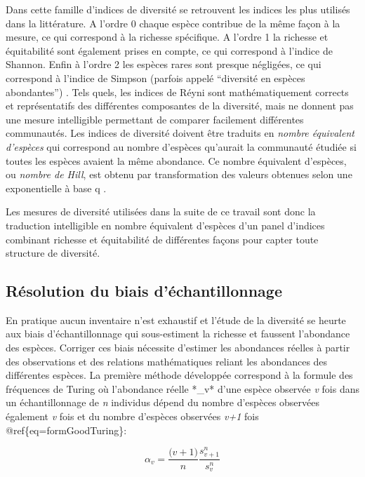 \documentclass[
  11pt,
  french,
  A4paper,
  extrafontsizes,onecolumn,openright
  ]{memoir}
\begin{document}
Dans cette famille d'indices de diversité se retrouvent les indices les
plus utilisés dans la littérature. A l'ordre 0 chaque espèce contribue
de la même façon à la mesure, ce qui correspond à la richesse
spécifique. A l'ordre 1 la richesse et équitabilité sont également
prises en compte, ce qui correspond à l'indice de Shannon. Enfin à
l'ordre 2 les espèces rares sont presque négligées, ce qui correspond à
l'indice de Simpson (parfois appelé ``diversité en espèces abondantes'')
\autocites{Shannon1948}{Simpson1949}{Patil1982}{Tothmeresz1995}. Tels
quels, les indices de Réyni sont mathématiquement corrects et
représentatifs des différentes composantes de la diversité, mais ne
donnent pas une mesure intelligible permettant de comparer facilement
différentes communautés. Les indices de diversité doivent être traduits
en \emph{nombre équivalent d'espèces} qui correspond au nombre d'espèces
qu'aurait la communauté étudiée si toutes les espèces avaient la même
abondance. Ce nombre équivalent d'espèces, ou \emph{nombre de Hill}, est
obtenu par transformation des valeurs obtenues selon une exponentielle à
base q \autocite{Hill1973}.

Les mesures de diversité utilisées dans la suite de ce travail sont donc
la traduction intelligible en nombre équivalent d'espèces d'un panel
d'indices combinant richesse et équitabilité de différentes façons pour
capter toute structure de diversité.

\subsection{Résolution du biais
d'échantillonnage}\label{resolution-du-biais-dechantillonnage}

En pratique aucun inventaire n'est exhaustif et l'étude de la diversité
se heurte aux biais d'échantillonnage qui sous-estiment la richesse et
faussent l'abondance des espèces. Corriger ces biais nécessite d'estimer
les abondances réelles à partir des observations et des relations
mathématiques reliant les abondances des différentes espèces. La
première méthode développée correspond à la formule des fréquences de
Turing \autocite{Good1953} où l'abondance réelle *\alpha\_v* d'une
espèce observée \emph{v} fois dans un échantillonnage de \emph{n}
individus dépend du nombre d'espèces observées également \emph{v} fois
et du nombre d'espèces observées \emph{v+1} fois
@ref\{eq=formGoodTuring\}:

\begin{equation}
\alpha_v=\frac{\big(v+1\big)}{n}\frac{s^n_{v+1}}{s^n_v}
\label{eq:formGoodTuring}
\end{equation}
\end{document}
